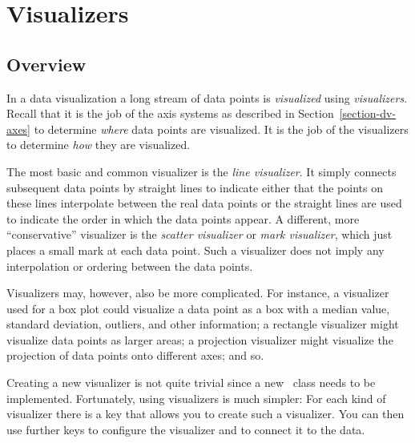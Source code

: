 %
%
%


\section[dv-visualizers]{Visualizers}
\label{section-dv-visualizers}

\subsection{Overview}

In a data visualization a long stream of data points is \emph{visualized} using
\emph{visualizers}. Recall that it is the job of the axis systems as described
in Section~\ref{section-dv-axes} to determine \emph{where} data points are
visualized. It is the job of the visualizers to determine \emph{how} they are
visualized.

The most basic and common visualizer is the \emph{line visualizer}. It simply
connects subsequent data points by straight lines to indicate either that the
points on these lines interpolate between the real data points or the straight
lines are used to indicate the order in which the data points appear. A
different, more ``conservative'' visualizer is the \emph{scatter visualizer} or
\emph{mark visualizer}, which just places a small mark at each data point. Such
a visualizer does not imply any interpolation or ordering between the data
points.

Visualizers may, however, also be more complicated. For instance, a visualizer
used for a box plot could visualize a data point as a box with a median value,
standard deviation, outliers, and other information; a rectangle visualizer
might visualize data points as larger areas; a projection visualizer might
visualize the projection of data points onto different axes; and so.

Creating a new visualizer is not quite trivial since a new \pgfname\ class
needs to be implemented. Fortunately, using visualizers is much simpler: For
each kind of visualizer there is a key that allows you to create such a
visualizer. You can then use further keys to configure the visualizer and to
connect it to the data.

